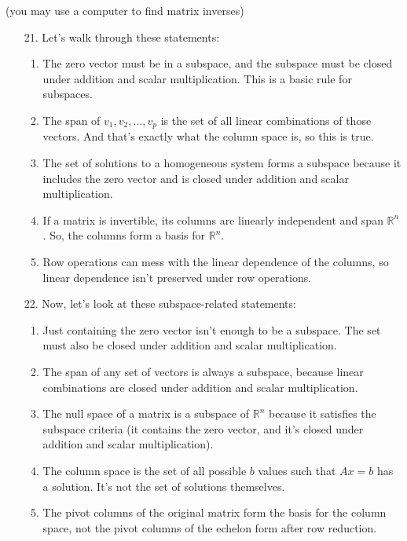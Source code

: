 \documentclass[12pt]{article}
\theoremstyle{definition}
\begin{document}
(you may use a computer to find matrix inverses)

{\color{red}
\begin{enumerate}
    \item[21.] Let’s walk through these statements:

    \begin{enumerate}
        \item The zero vector must be in a subspace, and the subspace must be closed under addition and scalar multiplication. This is a basic rule for subspaces.

        \item The span of \( v_1, v_2, \dots, v_p \) is the set of all linear combinations of those vectors. And that’s exactly what the column space is, so this is true.

        \item The set of solutions to a homogeneous system forms a subspace because it includes the zero vector and is closed under addition and scalar multiplication.

        \item If a matrix is invertible, its columns are linearly independent and span \( \mathbb{R}^n \). So, the columns form a basis for \( \mathbb{R}^n \).

        \item Row operations can mess with the linear dependence of the columns, so linear dependence isn’t preserved under row operations.
    \end{enumerate}

    \item[22.] Now, let’s look at these subspace-related statements:

    \begin{enumerate}
        \item Just containing the zero vector isn't enough to be a subspace. The set must also be closed under addition and scalar multiplication.

        \item The span of any set of vectors is always a subspace, because linear combinations are closed under addition and scalar multiplication.

        \item The null space of a matrix is a subspace of \( \mathbb{R}^n \) because it satisfies the subspace criteria (it contains the zero vector, and it’s closed under addition and scalar multiplication).

        \item The column space is the set of all possible \( b \) values such that \( Ax = b \) has a solution. It’s not the set of solutions themselves.

        \item The pivot columns of the original matrix form the basis for the column space, not the pivot columns of the echelon form after row reduction.
    \end{enumerate}
\end{enumerate}
}
\end{document}
